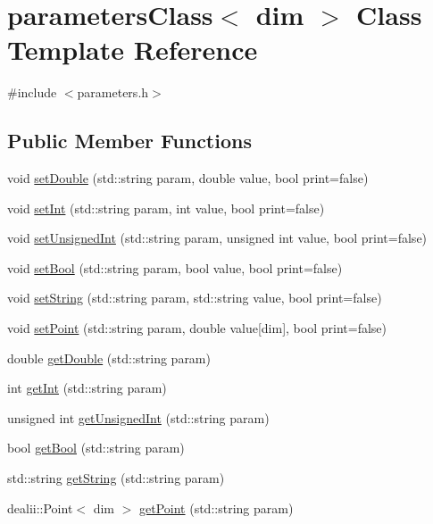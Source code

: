 \section{parameters\+Class$<$ dim $>$ Class Template Reference}
\label{classparameters_class}


{\ttfamily \#include $<$parameters.\+h$>$}

\subsection*{Public Member Functions}
\begin{DoxyCompactItemize}
\item 
void \mbox{\hyperlink{classparameters_class_ab2755d1057bef657585eb7fdb7d4b5c4}{set\+Double}} (std\+::string param, double value, bool print=false)
\item 
void \mbox{\hyperlink{classparameters_class_a68203d58af0caf8d232ca9a6fcb0a190}{set\+Int}} (std\+::string param, int value, bool print=false)
\item 
void \mbox{\hyperlink{classparameters_class_a8250a061bef7ccda26e06678c8935f43}{set\+Unsigned\+Int}} (std\+::string param, unsigned int value, bool print=false)
\item 
void \mbox{\hyperlink{classparameters_class_a182ca3f26a78847edd31e99fe68059da}{set\+Bool}} (std\+::string param, bool value, bool print=false)
\item 
void \mbox{\hyperlink{classparameters_class_ab06f012067df1884ecc3a71488aa9ca3}{set\+String}} (std\+::string param, std\+::string value, bool print=false)
\item 
void \mbox{\hyperlink{classparameters_class_aeb69e592e5c35d16379edd69a45af4fd}{set\+Point}} (std\+::string param, double value\mbox{[}dim\mbox{]}, bool print=false)
\item 
double \mbox{\hyperlink{classparameters_class_a40b9baa33a85fa60f5df2996d7dec98b}{get\+Double}} (std\+::string param)
\item 
int \mbox{\hyperlink{classparameters_class_aa97dc7db4ec450afd1cb8bd0d8e00d12}{get\+Int}} (std\+::string param)
\item 
unsigned int \mbox{\hyperlink{classparameters_class_ac01aa6fa0c3b6914b0e7b75128c99bc3}{get\+Unsigned\+Int}} (std\+::string param)
\item 
bool \mbox{\hyperlink{classparameters_class_a7c4393bb42319d396ddf38c2464c7062}{get\+Bool}} (std\+::string param)
\item 
std\+::string \mbox{\hyperlink{classparameters_class_a988c0deb4c2cf7e8ed80e39498c1eb58}{get\+String}} (std\+::string param)
\item 
dealii\+::\+Point$<$ dim $>$ \mbox{\hyperlink{classparameters_class_ab98c50b2209c80346a3e6efdd71589b5}{get\+Point}} (std\+::string param)
\end{DoxyCompactItemize}
